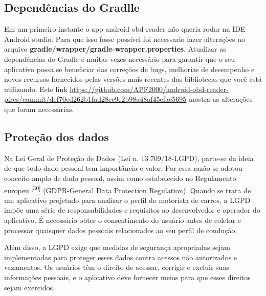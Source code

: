     \subsection{Dependências do Gradlle}

    Em um primeiro instante o app android-obd-reader não queria rodar na IDE Android studio. Para que isso fosse possível foi necessario fazer alterações no arquivo \textbf{gradle/wrapper/gradle-wrapper.properties}. Atualizar as dependências do Gradle  é muitas vezes necessário para garantir que o seu aplicativo possa se beneficiar das correções de bugs, melhorias de desempenho e novos recursos fornecidos pelas versões mais recentes das bibliotecas que você está utilizando. Este link \url{https://github.com/APF2000/android-obd-reader-pires/commit/def70ed262b1fad28cc9e2b98a48af45cfac5695} mostra as alterações que foram necessárias.

    \subsection{Proteção dos dados}
    
    Na Lei Geral de Proteção de Dados (Lei n. 13.709/18-LGPD), parte-se da ideia de que todo dado pessoal tem importância e valor. Por essa razão se adotou conceito amplo de dado pessoal, assim como estabelecido no Regulamento europeu \textsuperscript{[30]} (GDPR-General Data Protection  Regulation). Quando se trata de um aplicativo projetado para analisar o perfil do motorista de carros, a LGPD impõe uma série de responsabilidades e requisitos ao desenvolvedor e operador do aplicativo. É necessário obter o consentimento  do usuário antes de coletar e processar quaisquer dados pessoais relacionados ao seu perfil de condução.
    
    Além disso, a LGPD exige que medidas de segurança apropriadas sejam implementadas para proteger esses dados contra acessos não autorizados e vazamentos. Os usuários têm o direito de acessar, corrigir e excluir suas informações pessoais, e o aplicativo deve fornecer meios para que esses direitos sejam exercidos.






